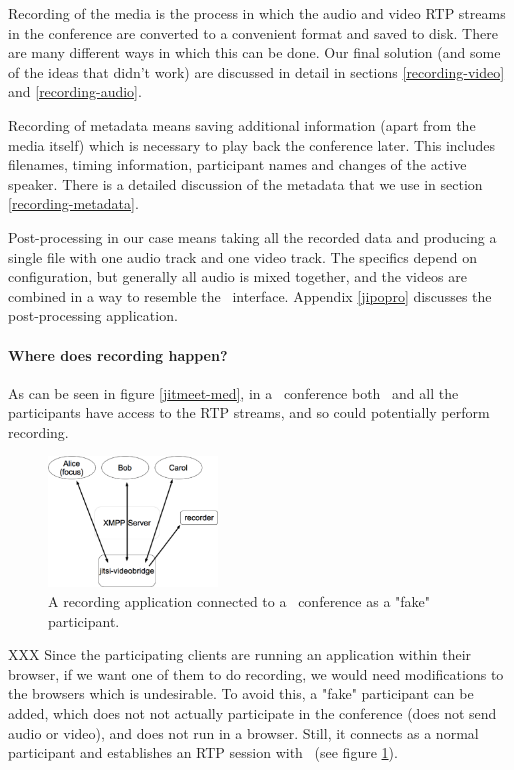 \documentclass[twoside,openright,a4paper,12pt,english]{article}
\begin{document}
Recording of the media is the process in which the audio and video RTP streams
in the conference are converted to a convenient format and saved to disk. There
are many different ways in which this can be done. Our final solution (and some
of the ideas that didn't work) are discussed in detail in
sections \ref{recording-video} and \ref{recording-audio}.

Recording of metadata means saving additional information (apart from the media
itself) which is necessary to play back the conference later. This includes filenames,
timing information, participant names and changes of the active speaker. There
is a detailed discussion of the
metadata that we use in section \ref{recording-metadata}.

Post-processing in our case means taking all the recorded data and producing a
single file with one audio track and one video track. The specifics depend on
configuration, but
generally all audio is mixed together, and the videos are combined in a way to
resemble the \jm\ interface. Appendix \ref{jipopro} discusses the
post-processing application.


\paragraph*{Where does recording happen?}
As can be seen in figure \ref{jitmeet-med}, in a \jm\ conference both \jvb\ and
all the participants have access to the RTP streams, and so could potentially
perform recording.

\begin{figure}
   \centering
        \includegraphics[width=0.4\textwidth]{./pics/jm-rec.eps}
        \caption{A recording application connected to a \jm\ conference as a "fake" participant.}
   \label{jitmeet-rec}
\end{figure}

XXX
Since the participating clients are running an application within their
browser, if we want one of them to do recording, we would need modifications to
the browsers which is undesirable. To avoid this, a "fake" participant can
be added, which does not not actually participate in the conference
(does not send audio or video), and does not run in a browser. Still, it
connects as a normal participant and establishes an RTP session with \jvb\ (see
figure \ref{jitmeet-rec}).
\end{document}
